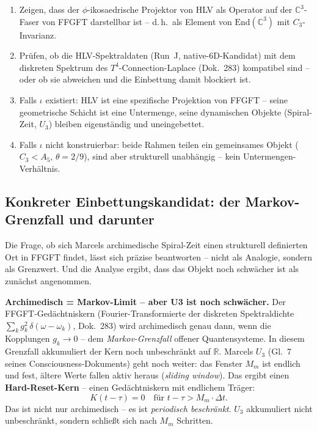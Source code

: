 \begin{enumerate}
  \item Zeigen, dass der $\phi$-ikosaedrische Projektor von HLV als
    Operator auf der $\mathbb{C}^3$-Faser von FFGFT darstellbar ist --
    d.\,h.\ als Element von $\mathrm{End}(\mathbb{C}^3)$ mit
    $C_3$-Invarianz.
  \item Prüfen, ob die HLV-Spektraldaten (Run~J, native-6D-Kandidat)
    mit dem diskreten Spektrum des $T^4$-Connection-Laplace (Dok.~283)
    kompatibel sind -- oder ob sie abweichen und die Einbettung damit
    blockiert ist.
  \item Falls $\iota$ existiert: HLV ist eine spezifische Projektion
    von FFGFT -- seine geometrische Schicht ist eine Untermenge, seine
    dynamischen Objekte (Spiral-Zeit, $U_3$) bleiben eigenständig und
    uneingebettet.
  \item Falls $\iota$ nicht konstruierbar: beide Rahmen teilen ein
    gemeinsames Objekt ($C_3 < A_5$, $\theta = 2/9$), sind aber
    strukturell unabhängig -- kein Untermengen-Verhältnis.
\end{enumerate}

\subsection*{Konkreter Einbettungskandidat: der Markov-Grenzfall und darunter}

Die Frage, ob sich Marcels archimedische Spiral-Zeit einen strukturell
definierten Ort in FFGFT findet, lässt sich präzise beantworten -- nicht
als Analogie, sondern als Grenzwert. Und die Analyse ergibt, dass das
Objekt noch schwächer ist als zunächst angenommen.

\textbf{Archimedisch = Markov-Limit -- aber U3 ist noch schwächer.} Der
FFGFT-Gedächtniskern (Fourier-Transformierte der diskreten Spektraldichte
$\sum_k g_k^2\,\delta(\omega-\omega_k)$, Dok.~283) wird archimedisch
genau dann, wenn die Kopplungen $g_k \to 0$ -- dem \emph{Markov-Grenzfall}
offener Quantensysteme. In diesem Grenzfall akkumuliert der Kern noch
unbeschränkt auf $\mathbb{R}$. Marcels $U_3$ (Gl.~7 seines
Consciousness-Dokuments) geht noch weiter: das Fenster $M_m$ ist endlich
und fest, ältere Werte fallen aktiv heraus (\emph{sliding window}). Das
ergibt einen \textbf{Hard-Reset-Kern} -- einen Gedächtniskern mit endlichem
Träger:
\begin{equation}
  K(t-\tau) = 0 \quad \text{für } t-\tau > M_m\cdot\Delta t.
\end{equation}
Das ist nicht nur archimedisch -- es ist \emph{periodisch beschränkt}.
$U_3$ akkumuliert nicht unbeschränkt, sondern schließt sich nach $M_m$
Schritten.

